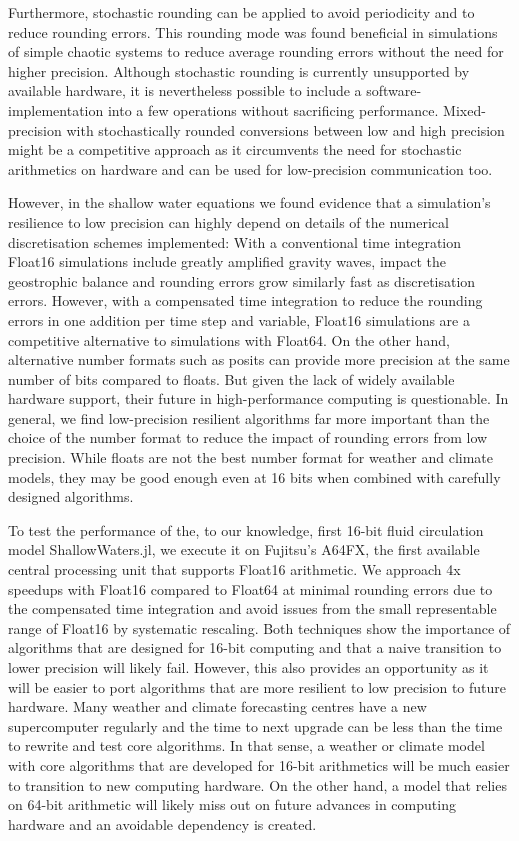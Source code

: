 Furthermore, stochastic rounding can be applied to avoid periodicity and to reduce rounding errors. This rounding mode was found beneficial in 
simulations of simple chaotic systems to reduce average rounding errors without the need for higher precision.  Although stochastic rounding is
currently unsupported by available hardware, it is nevertheless possible to include a software-implementation into a few operations without
sacrificing performance. Mixed-precision with stochastically rounded conversions between low and high precision might be a competitive
approach as it circumvents the need for stochastic arithmetics on hardware and can be used for low-precision communication too.

However, in the shallow water equations we found evidence that a simulation's resilience to low precision can highly depend on details of the
numerical discretisation schemes implemented: With a conventional time integration Float16 simulations include greatly amplified gravity waves,
impact the geostrophic balance and rounding errors grow similarly fast as discretisation errors. However, with a compensated time integration to
reduce the rounding errors in one addition per time step and variable, Float16 simulations are a competitive alternative to simulations with Float64.
On the other hand, alternative number formats such as posits can provide more precision at the same number of bits compared to floats.
But given the lack of widely available hardware support, their future in high-performance computing is questionable. In general, we find
low-precision resilient algorithms far more important than the choice of the number format to reduce the impact of rounding errors from
low precision. While floats are not the best number format for weather and climate models, they may be good enough even at 16 bits when
combined with carefully designed algorithms.

To test the performance of the, to our knowledge, first 16-bit fluid circulation model ShallowWaters.jl, we execute it on Fujitsu's A64FX, the first
available central processing unit that supports Float16 arithmetic. We approach 4x speedups with Float16 compared to Float64 at minimal
rounding errors due to the compensated time integration and avoid issues from the small representable range of Float16 by systematic rescaling.
Both techniques show the importance of algorithms that are designed for 16-bit computing and that a naive transition to lower precision will
likely fail. However, this also provides an opportunity as it will be easier to port algorithms that are more resilient to low precision to future hardware.
Many weather and climate forecasting centres have a new supercomputer regularly and the time to next upgrade can be less than
the time to rewrite and test core algorithms. In that sense, a weather or climate model with core algorithms that are developed for 16-bit
arithmetics will be much easier to transition to new computing hardware. On the other hand, a model that relies on 64-bit arithmetic will
likely miss out on future advances in computing hardware and an avoidable dependency is created.

